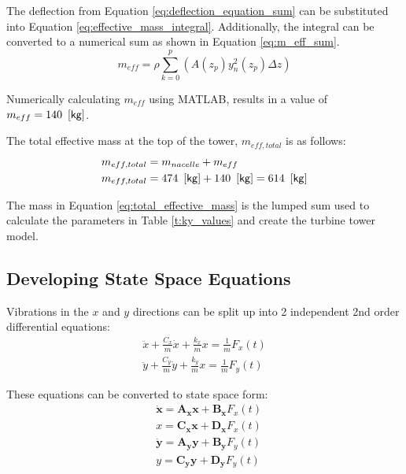 The deflection from Equation \ref{eq:deflection_equation_sum} can be substituted into Equation \ref{eq:effective_mass_integral}.  Additionally, the integral can be converted to a numerical sum as shown in Equation \ref{eq:m_eff_sum}.
\begin{equation} \label{eq:m_eff_sum}
	m_{eff} = \rho \sum_{k=0}^{p}{\left(A(z_p) y_n^2(z_p) \Delta z \right)}
\end{equation}

Numerically calculating $m_{eff}$ using MATLAB, results in a value of $m_{eff}=140 \ \left[\mathsf{kg} \right]$.

The total effective mass at the top of the tower, $m_{eff,total}$ is as follows:
\begin{align}
	m_{eff,total} &= m_{nacelle} + m_{eff} \\
	m_{eff,total} &= 474 \ \left[\mathsf{kg} \right] + 140 \ \left[\mathsf{kg} \right] = 614 \ \left[\mathsf{kg} \right] \label{eq:total_effective_mass}
\end{align}

The mass in Equation \ref{eq:total_effective_mass} is the lumped sum used to calculate the  parameters in Table \ref{t:ky_values} and create the turbine tower model.

\subsection{Developing State Space Equations}
Vibrations in the $x$ and $y$ directions can be split up into 2 independent 2nd order differential equations:
\begin{align}
	\ddot{x} + \frac{C_x}{m} \dot{x} + \frac{k_x}{m} x = \frac{1}{m} F_x(t) \\
	\ddot{y} + \frac{C_y}{m} \dot{y} + \frac{k_y}{m} x = \frac{1}{m} F_y(t)
\end{align}

These equations can be converted to state space form:
\begin{align}
	&\bm{\dot{x}} = \bm{A_x} \bm{x} + \bm{B_x} F_x(t) \\
	&x = \bm{C_x} \bm{x} + \bm{D_x} F_x(t) \\
	&\bm{\dot{y}} = \bm{A_y} \bm{y} + \bm{B_y} F_y(t) \\
	&y = \bm{C_y} \bm{y} + \bm{D_y} F_y(t)
\end{align}

